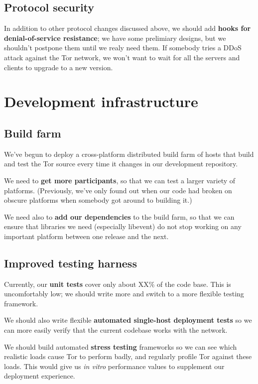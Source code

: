 \documentclass{article}
\begin{document}
\subsection{Protocol security}

In addition to other protocol changes discussed above,
we should add {\bf hooks for denial-of-service resistance}; we have some
prelimiary designs, but we shouldn't postpone them until we realy need them.
If somebody tries a DDoS attack against the Tor network, we won't want to
wait for all the servers and clients to upgrade to a new version.

\section{Development infrastructure}

\subsection{Build farm}
We've begun to deploy a cross-platform distributed build farm of hosts
that build and test the Tor source every time it changes in our development
repository.

We need to {\bf get more participants}, so that we can test a larger variety
of platforms.  (Previously, we've only found out when our code had broken on
obscure platforms when somebody got around to building it.)

We need also to {\bf add our dependencies} to the build farm, so that we can
ensure that libraries we need (especially libevent) do not stop working on
any important platform between one release and the next.

\subsection{Improved testing harness}
Currently, our {\bf unit tests} cover only about XX\% of the code base.  This
is uncomfortably low; we should write more and switch to a more flexible
testing framework.

We should also write flexible {\bf automated single-host deployment tests} so
we can more easily verify that the current codebase works with the network.

We should build automated {\bf stress testing} frameworks so we can see which
realistic loads cause Tor to perform badly, and regularly profile Tor against
these loads.  This would give us {\it in vitro} performance values to
supplement our deployment experience.
\end{document}
